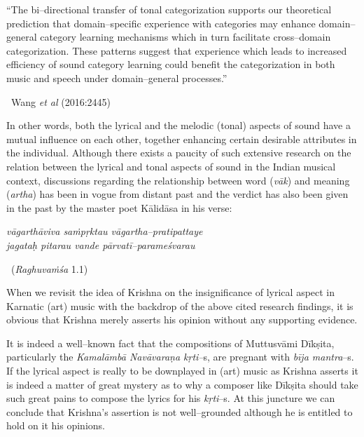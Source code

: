 \begin{myquote}
“The bi–directional transfer of tonal categorization supports our theoretical prediction that domain–specific experience with categories may enhance domain–general category learning mechanisms which in turn facilitate cross–domain categorization. These patterns suggest that experience which leads to increased efficiency of sound category learning could benefit the categorization in both music and speech under domain–general processes.”
\end{myquote}

\vspace{-.3cm}

\begin{myquote}

~\hfill Wang \textit{et al} (2016:2445)
\end{myquote}

In other words, both the lyrical and the melodic (tonal) aspects of sound have a mutual influence on each other, together enhancing certain desirable attributes in the individual. Although there exists a paucity of such extensive research on the relation between the lyrical and tonal aspects of sound in the Indian musical context, discussions regarding the relationship between word (\textit{vāk}) and meaning (\textit{artha}) has been in vogue from distant past and the verdict has also been given in the past by the master poet Kālidāsa in his verse:

\vspace{.1cm}

\begin{myquote}
\textit{vāgarthāviva saṁpṛktau vāgartha–pratipattaye  }\\\textit{jagataḥ pitarau vande pārvatī–parameśvarau } 

~\hfill (\textit{Raghuvaṁśa} 1.1)
\end{myquote}

\vspace{.1cm}

When we revisit the idea of Krishna on the insignificance of lyrical aspect in Karnatic (art) music with the backdrop of the above cited research findings, it is obvious that Krishna merely asserts his opinion without any supporting evidence.

It is indeed a well–known fact that the compositions of Muttusvāmi Dīkṣita, particularly the \textit{Kamalāmbā Navāvaraṇa kṛti–}s, are pregnant with \textit{bīja mantra}–s. If the lyrical aspect is really to be downplayed in (art) music as Krishna asserts it is indeed a matter of great mystery as to why a composer like Dīkṣita should take such great pains to compose the lyrics for his \textit{kṛti}–s. At this juncture we can conclude that Krishna’s assertion is not well–grounded although he is entitled to hold on it his opinions.

